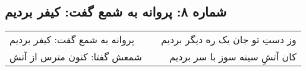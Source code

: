 \begin{center}
\section*{شماره ۸: پروانه به شمع گفت: کیفر بردیم}
\label{sec:008}
\begin{longtable}{l p{0.5cm} r}
پروانه به شمع گفت: کیفر بردیم
&&
وز دستِ تو جان یک ره دیگر بردیم
\\
شمعش گفتا: کنون مترس از آتش
&&
کان آتشِ سینه سوز با سر بردیم
\\
\end{longtable}
\end{center}

